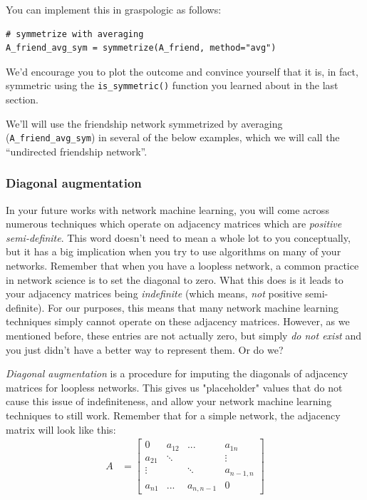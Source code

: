 You can implement this in graspologic as follows:
\begin{lstlisting}[style=python]
# symmetrize with averaging
A_friend_avg_sym = symmetrize(A_friend, method="avg")
\end{lstlisting}
We'd encourage you to plot the outcome and convince yourself that it is, in fact, symmetric using the \texttt{is\_symmetric()} function you learned about in the last section.

We'll will use the friendship network symmetrized by averaging (\texttt{A\_friend\_avg\_sym}) in several of the below examples, which we will call the ``undirected friendship network''.

\subsubsection{Diagonal augmentation}
\label{sec:ch4:regularization:diag_aug}

In your future works with network machine learning, you will come across numerous techniques which operate on adjacency matrices which are \emph{positive semi-definite}. This word doesn't need to mean a whole lot to you conceptually, but it has a big implication when you try to use algorithms on many of your networks. Remember that when you have a loopless network, a common practice in network science is to set the diagonal to zero. What this does is it leads to your adjacency matrices being \emph{indefinite} (which means, \emph{not} positive semi-definite). For our purposes, this means that many network machine learning techniques simply cannot operate on these adjacency matrices. However, as we mentioned before, these entries are not actually zero, but simply \emph{do not exist} and you just didn't have a better way to represent them. Or do we?

\emph{Diagonal augmentation} is a procedure for imputing the diagonals of adjacency matrices for loopless networks. This gives us "placeholder" values that do not cause this issue of indefiniteness, and allow your network machine learning techniques to still work. Remember that for a simple network, the adjacency matrix will look like this:
\begin{align*}
    A &= \begin{bmatrix}
        0 & a_{12} & ... & a_{1n} \\
        a_{21}& \ddots & & \vdots \\
        \vdots & & \ddots & a_{n-1, n} \\
        a_{n1} &...& a_{n, n-1} & 0
    \end{bmatrix}
\end{align*}

